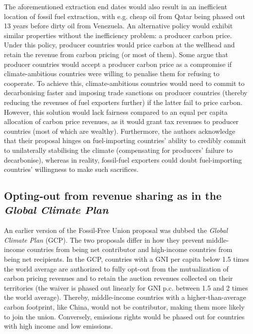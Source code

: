 \documentclass[12pt,english]{article}
\begin{document}
The aforementioned extraction end dates would also result in an inefficient location of fossil fuel extraction,\citep{coulomb_bad_2025} with e.g. cheap oil from Qatar being phased out 13 years before dirty oil from Venezuela. An alternative policy would exhibit similar properties without the inefficiency problem: a producer carbon price. Under this policy, producer countries would price carbon at the wellhead and retain the revenue from carbon pricing (or most of them). Some argue that producer countries would accept a producer carbon price as a compromise if climate-ambitious countries were willing to penalise them for refusing to cooperate. To achieve this, climate-ambitious countries would need to commit to decarbonising faster and imposing trade sanctions on producer countries (thereby reducing the revenues of fuel exporters further) if the latter fail to price carbon.\citep{peszko_cooperative_2019} However, this solution would lack fairness compared to an equal per capita allocation of carbon price revenues, as it would grant tax revenues to producer countries (most of which are wealthy). Furthermore, the authors acknowledge that their proposal hinges on fuel-importing countries' ability to credibly commit to unilaterally stabilising the climate (compensating for producers' failure to decarbonise), whereas in reality, fossil-fuel exporters could doubt fuel-importing countries' willingness to make such sacrifices.

\subsection{Opting-out from revenue sharing as in the \textit{Global Climate Plan}}\label{subsec:gcp}

An earlier version of the Fossil-Free Union proposal was dubbed the \textit{Global Climate Plan} (GCP).\cite{fabre_global_2023,fabre_global_2024} The two proposals differ in how they prevent middle-income countries from being net contributor and high-income countries from being net recipients. In the GCP, countries with a GNI per capita below 1.5 times the world average are authorized to fully opt-out from the mutualization of carbon pricing revenues and to retain the auction revenues collected on their territories (the waiver is phased out linearly for GNI p.c. between 1.5 and 2 times the world average). Thereby, middle-income countries with a higher-than-average carbon footprint, like China, would not be contributor, making them more likely to join the union. Conversely, emissions rights would be phased out for countries with high income and low emissions. 
\end{document}
